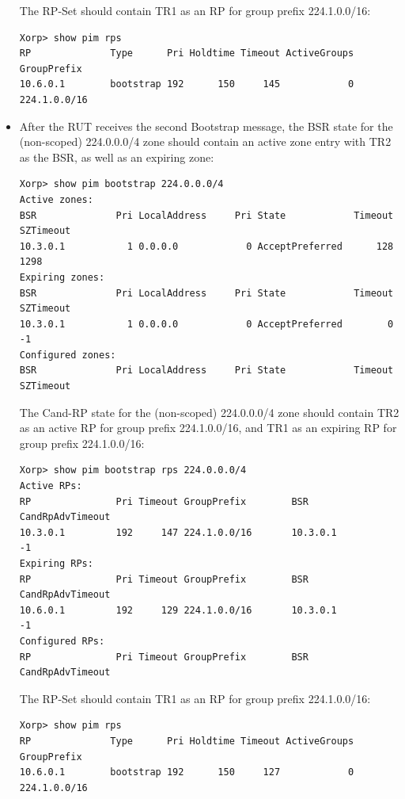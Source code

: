 \documentclass[11pt]{report}
\begin{document}
\begin{itemize}
  The RP-Set should contain TR1 as an RP for group prefix 224.1.0.0/16:

\begin{verbatim}
Xorp> show pim rps 
RP              Type      Pri Holdtime Timeout ActiveGroups GroupPrefix       
10.6.0.1        bootstrap 192      150     145            0 224.1.0.0/16      
\end{verbatim}

  \item After the RUT receives the second Bootstrap message, the BSR state for
  the (non-scoped) 224.0.0.0/4 zone should contain an active zone entry with
  TR2 as the BSR, as well as an expiring zone:

\begin{verbatim}
Xorp> show pim bootstrap 224.0.0.0/4
Active zones:
BSR              Pri LocalAddress     Pri State            Timeout SZTimeout
10.3.0.1           1 0.0.0.0            0 AcceptPreferred      128      1298
Expiring zones:
BSR              Pri LocalAddress     Pri State            Timeout SZTimeout
10.3.0.1           1 0.0.0.0            0 AcceptPreferred        0        -1
Configured zones:
BSR              Pri LocalAddress     Pri State            Timeout SZTimeout
\end{verbatim}

  The Cand-RP state for the (non-scoped) 224.0.0.0/4 zone should
  contain TR2 as an active RP for group prefix 224.1.0.0/16, and TR1 as an
  expiring RP for group prefix 224.1.0.0/16:

\begin{verbatim}
Xorp> show pim bootstrap rps 224.0.0.0/4
Active RPs:
RP               Pri Timeout GroupPrefix        BSR         CandRpAdvTimeout
10.3.0.1         192     147 224.1.0.0/16       10.3.0.1                  -1
Expiring RPs:
RP               Pri Timeout GroupPrefix        BSR         CandRpAdvTimeout
10.6.0.1         192     129 224.1.0.0/16       10.3.0.1                  -1
Configured RPs:
RP               Pri Timeout GroupPrefix        BSR         CandRpAdvTimeout
\end{verbatim}

  The RP-Set should contain TR1 as an RP for group prefix 224.1.0.0/16:

\begin{verbatim}
Xorp> show pim rps 
RP              Type      Pri Holdtime Timeout ActiveGroups GroupPrefix       
10.6.0.1        bootstrap 192      150     127            0 224.1.0.0/16      
\end{verbatim}


\end{itemize}
\end{document}
